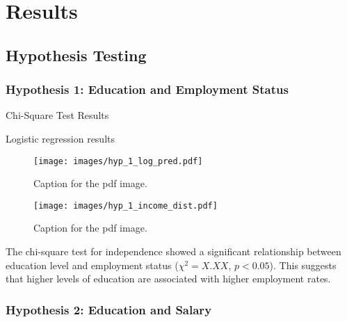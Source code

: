 \section{Results}

\subsection{Hypothesis Testing}

\subsubsection{Hypothesis 1: Education and Employment Status}

\begin{table}[H]
    \caption{Chi-Square Test Results}
    \label{tab:chi_square_results}
    \begin{minipage}{\columnwidth}
        \centering
        
    \end{minipage}
\end{table}

\begin{table}[H]
    \centering
    \scriptsize
    \caption{Logistic regression results}
    \begin{minipage}{\columnwidth}
        
    \end{minipage}
\end{table}

\begin{figure}[H]
    \centering
    \texttt{[image: images/hyp\_1\_log\_pred.pdf]} %
    \caption{Caption for the pdf image.}
    \label{fig:predicted unemployment for highest academic level}
\end{figure}

\begin{figure}[H]
    \centering
    \texttt{[image: images/hyp\_1\_income\_dist.pdf]} %
    \caption{Caption for the pdf image.}
    \label{fig:unemployment distribution for unemployment highest academic level}
\end{figure}

The chi-square test for independence showed a significant relationship between education level and employment status ($\chi^2 = X.XX$, $p < 0.05$). This suggests that higher levels of education are associated with higher employment rates.

\subsubsection{Hypothesis 2: Education and Salary}

